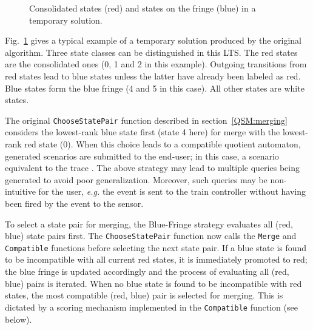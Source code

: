 \begin{figure}
\hspace*{-1cm}
\vspace*{-.5cm}
\caption{Consolidated states (red) and states on the fringe (blue) in a temporary solution\label{Fig:BlueFringe}.}
\end{figure}

Fig.~\ref{Fig:BlueFringe} gives a typical example of a temporary solution produced by the original algorithm. Three state classes can be distinguished in this LTS. The red states are the consolidated ones (0, 1 and 2 in this example). Outgoing transitions from red states lead to blue states unless the latter have already been labeled as red. Blue states form the blue fringe (4 and 5 in this case). All other states are white states. 

The original \texttt{ChooseStatePair} function described in section~\ref{QSM:merging} considers the lowest-rank blue state first (state 4 here) for merge with the lowest-rank red state (0). When this choice leads to a compatible quotient automaton, generated scenarios are submitted to the end-user; in this case, a scenario equivalent to the trace . The above strategy may lead to multiple queries being generated to avoid poor generalization. Moreover, such queries may be non-intuitive for the user, \textit{e.g.} the  event is sent to the train controller without having been fired by the  event to the sensor.

To select a state pair for merging, the Blue-Fringe strategy evaluates all (red, blue) state pairs first. The \texttt{ChooseStatePair} function now calls the \texttt{Merge} and \texttt{Compatible} functions before selecting the next state pair. If a blue state is found to be incompatible with all current red states, it is immediately promoted to red; the blue fringe is updated accordingly and the process of evaluating all (red, blue) pairs is iterated. When no blue state is found to be incompatible with red states, the most compatible (red, blue) pair is selected for merging. This is dictated by a scoring mechanism implemented in the \texttt{Compatible} function (see below).

